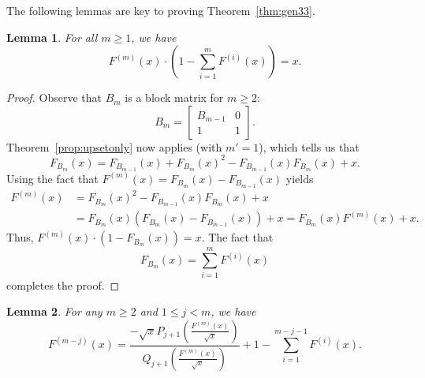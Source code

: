 \documentclass[12pt]{amsart}
\newtheorem{lemma}{Lemma}
\newcommand{\gfll}[1]{F_{#1}(x)}
\newcommand{\gfnoa}[1]{F^{(#1)}(x)}
\begin{document}
The following lemmas are key to proving Theorem~\ref{thm:gen33}.
\begin{lemma}\label{lem:gen33gf}
    For all $m\geq1$, we have
    \[
    \gfnoa{m}\cdot\left(1-\sum_{i=1}^{m}\gfnoa{i}\right)=x.
    \]
\end{lemma}
\begin{proof}
    Observe that $B_m$ is a block matrix for $m\geq2$:
    \[
    B_m=\left[\begin{array}{c|c}B_{m-1}&0\\\hline1&1\end{array}\right].
    \]
    Theorem~\ref{prop:upsetonly} now applies (with $m'=1$),
    which tells us that
    \[
    \gfll{B_m}=\gfll{B_{m-1}}+\gfll{B_m}^2-\gfll{B_{m-1}}\gfll{B_m}+x.
    \]
    Using the fact that $\gfnoa{m}=\gfll{B_m}-\gfll{B_{m-1}}$ yields
    \begin{align*}
    \gfnoa{m}&=\gfll{B_m}^2-\gfll{B_{m-1}}\gfll{B_m}+x\\
    &=\gfll{B_m}\left(\gfll{B_m}-\gfll{B_{m-1}}\right)+x=\gfll{B_m}\gfnoa{m}+x.
    \end{align*}
    Thus, $\gfnoa{m}\cdot\left(1-\gfll{B_m}\right)=x$.
    The fact that
    \[
    \gfll{B_m}=\sum_{i=1}^m\gfnoa{i}
    \]
    completes the proof.
\end{proof}
\begin{lemma}\label{lem:gen33}
    For any $m\geq2$ and $1\leq j<m$, we have
    \[
    \gfnoa{m-j}=\frac{-\sqrt{x}P_{j+1}\!\left(\frac{\gfnoa{m}}{\sqrt{x}}\right)}{Q_{j+1}\!\left(\frac{\gfnoa{m}}{\sqrt{x}}\right)}+1-\sum_{i=1}^{m-j-1}\gfnoa{i}.
    \]
\end{lemma}
\end{document}
